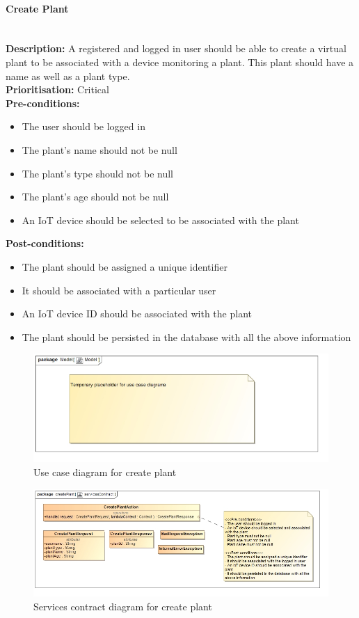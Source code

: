 \documentclass{article}
\begin{document}
	\paragraph{Create Plant}\mbox{}\\
		\textbf{Description:} A registered and logged in user should be able to create a virtual plant to be associated with a device monitoring a plant. This plant should have a name as well as a plant type.\\
		\textbf{Prioritisation:} Critical\\		
		\textbf{Pre-conditions:}
			\begin{itemize}
				\item The user should be logged in
				\item The plant's name should not be null
				\item The plant's type should not be null
				\item The plant's age should not be null
				\item An IoT device should be selected to be associated with the plant
			\end{itemize}
		\textbf{Post-conditions:}
			\begin{itemize}
				\item The plant should be assigned a unique identifier
				\item It should be associated with a particular user
				\item An IoT device ID should be associated with the plant
				\item The plant should be persisted in the database with all the above information
			\end{itemize}

		\begin{figure}[H]
			\includegraphics[width=\linewidth]{images/tempUseCase.jpg}
			\caption{Use case diagram for create plant}
		\end{figure}
		
		\begin{figure}[H]
			\includegraphics[width=\linewidth]{images/ServicesContracts/createPlant.jpg}
			\caption{Services contract diagram for create plant}
		\end{figure}
		
\end{document}
